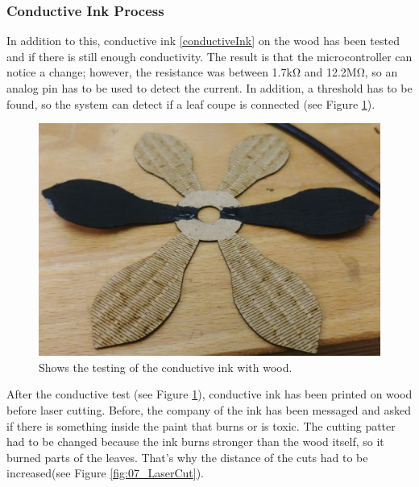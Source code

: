 \documentclass[04.3_buildingProcess.tex]{subfiles}
\begin{document}
    \subsubsection{Conductive Ink Process}
    \begin{flushleft}
        \noindent
        In addition to this, conductive ink \ref{conductiveInk} on the wood has been tested and if there is 
        still enough conductivity. The result is that the microcontroller can notice a 
        change; however, the resistance was between 1.7k\si{\ohm} and 12.2M\si{\ohm}, 
        so an analog pin has to be used to detect the current. In addition, a threshold has to be found, so 
        the system can detect if a leaf coupe is connected (see Figure \ref{fig:leaveConductiveInk}).

        \begin{figure}[h!]
            \centering
            \includegraphics[scale=0.05]{images/materialProcess/leaveTesting_.jpg}
            \caption{Shows the testing of the conductive ink with wood.}
            \label{fig:leaveConductiveInk}
        \end{figure}

        \noindent
        After the conductive test (see Figure \ref{fig:leaveConductiveInk}), conductive ink has been 
        printed on wood before laser cutting. Before, the company of the ink has been messaged and asked 
        if there is something inside the paint that burns or is toxic. The cutting patter had to be changed 
        because the ink burns stronger than the wood itself, so it burned parts of the leaves. 
        That's why the distance of the cuts had to be increased(see Figure \ref{fig:07_LaserCut}). 


\end{flushleft}
\end{document}
